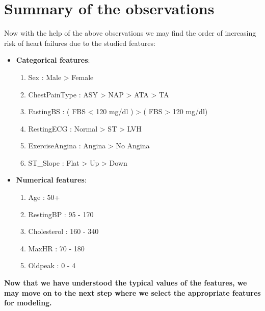 \section{Summary of the observations}
Now with the help of the above observations we may find the order of increasing risk of heart failures due to the studied features:
\begin{itemize}
    \item \textbf{Categorical features}:
    \begin{enumerate}
        \item Sex : Male > Female
        \item ChestPainType : ASY > NAP > ATA > TA
        \item FastingBS : ( FBS < 120 mg/dl ) > ( FBS > 120 mg/dl)
        \item RestingECG : Normal > ST > LVH
        \item ExerciseAngina : Angina > No Angina
        \item ST\_Slope : Flat > Up > Down
    \end{enumerate}
    \item \textbf{Numerical features}:
    \begin{enumerate}
        \item Age : 50+
        \item RestingBP : 95 - 170 
        \item Cholesterol : 160 - 340
        \item MaxHR : 70 - 180
        \item Oldpeak : 0 - 4
    \end{enumerate}
\end{itemize}
\textbf{Now that we have understood the typical values of the features, we may move on to the next step where we select the appropriate features for modeling.}
